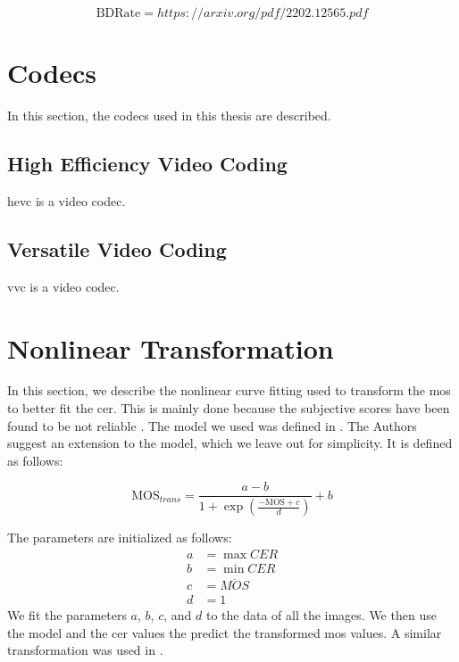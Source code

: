 \begin{equation}
    \text{BDRate} = https://arxiv.org/pdf/2202.12565.pdf
    \label{eq:bdrate}
\end{equation}

\section{Codecs}
\label{sec:codecs}

In this section, the codecs used in this thesis are described.

\subsection{High Efficiency Video Coding}
\label{subsec:hevc}

\gls{hevc} is a video codec.

\subsection{Versatile Video Coding}
\label{subsec:vvc}

\gls{vvc} is a video codec.

\section{Nonlinear Transformation}
\label{sec:nonlinear}

In this section, we describe the nonlinear curve fitting used to transform the \gls{mos} to better fit the \gls{cer}.
This is mainly done because the subjective scores have been found to be not reliable \cite{nonlin_fit_original_2000}.
The model we used was defined in \cite{nonlin_fit_original_2000}.
The Authors suggest an extension to the model, which we leave out for simplicity.
It is defined as follows:

\begin{equation}
    \text{MOS}_{trans} = \frac{a - b}{1 + \exp \left( \frac{-\text{MOS} + c}{d} \right)} + b
    \label{eq:nonlinear}
\end{equation}
    
The parameters are initialized as follows:
\begin{equation}
    \begin{aligned}
        a &= \max{CER} \\
        b &= \min{CER} \\
        c &= \overline{MOS} \\
        d &= 1
    \end{aligned}
    \label{eq:nonlinear_init}
\end{equation}
We fit the parameters \(a\), \(b\), \(c\), and \(d\) to the data of all the images.
We then use the model and the \gls{cer} values the predict the transformed \gls{mos} values.
A similar transformation was used in \cite{nonlin_fit_2011}\cite{nonlin_fit_appl_2017}.


